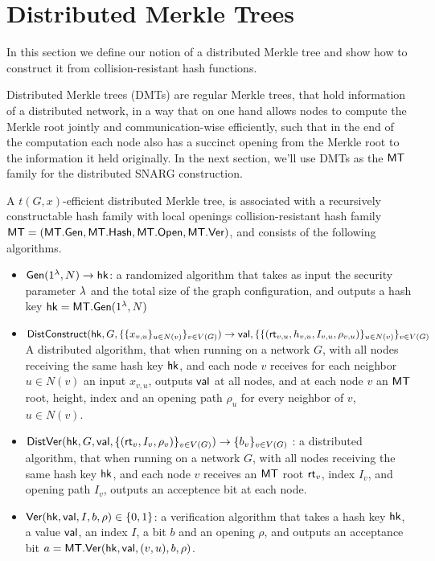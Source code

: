 \section{Distributed Merkle Trees}
\label{sec:distmerkle}
In this section we define our notion of a distributed Merkle tree and show how to construct it from collision-resistant hash functions.

Distributed Merkle trees (DMTs) are regular Merkle trees, that hold information of a distributed network, in a way that on one hand allows nodes to compute the Merkle root jointly and communication-wise efficiently, such that in the end of the computation each node also has a succinct opening from the Merkle root to the information it held originally. In the next section, we'll use DMTs as the $\mathsf{MT}$ family for the distributed SNARG construction.

A $t(G,x)$-efficient distributed Merkle tree, is associated with a recursively constructable hash family with local openings collision-resistant hash family $\mathsf{MT} = (\mathsf{MT}.\mathsf{Gen}, \mathsf{MT}.\mathsf{Hash}, \mathsf{MT}.\mathsf{Open}, \mathsf{MT}.\mathsf{Ver})$, and consists of the following algorithms.

\begin{itemize}
    \item $\mathsf{Gen}(1^\lambda, N)\to \mathsf{hk}$: a randomized algorithm that takes as input the security parameter $\lambda$ and the total size of the graph configuration, and outputs a hash key $\mathsf{hk} = \mathsf{MT}.\mathsf{Gen}(1^\lambda, N)$
    \item $\mathsf{DistConstruct}(\mathsf{hk}, G, \{\{x_{v,u}\}_{u\in N(v)}\}_{v\in V(G)})\rightarrow \mathsf{val}, \{\{(\mathsf{rt}_{v,u}, h_{v,u}, I_{v,u}, \rho_{v,u})\}_{u\in N(v)}\}_{v\in V(G)}$ A distributed algorithm, that when running on a network $G$, with all nodes receiving the same hash key $\mathsf{hk}$, and each node $v$ receives for each neighbor $u\in N(v)$ an input $x_{v,u}$, outputs $\mathsf{val}$ at all nodes, and at each node $v$ an $\mathsf{MT}$ root, height, index and an opening path $\rho_u$ for every neighbor of $v$, $u\in N(v)$.
    \item $\mathsf{DistVer}(\mathsf{hk}, G, \mathsf{val}, \{(\mathsf{rt}_v, I_v, \rho_v)\}_{v\in V(G)}) \rightarrow \{b_v\}_{v\in V(G)}$ : a distributed algorithm, that when running on a network $G$, with all nodes receiving the same hash key $\mathsf{hk}$, and each node $v$ receives an $\mathsf{MT}$ root $\mathsf{rt}_v$, index $I_v$, and opening path $I_v$, outputs an acceptence bit at each node.
    \item $\mathsf{Ver}(\mathsf{hk}, \mathsf{val}, I, b, \rho) \in \{0,1\}$: a verification algorithm that takes a hash key $\mathsf{hk}$, a value $\mathsf{val}$, an index $I$, a bit $b$ and an opening $\rho$, and outputs an acceptance bit $a = \mathsf{MT}.\mathsf{Ver}(\mathsf{hk}, \mathsf{val}, (v,u), b, \rho)$.
\end{itemize}

